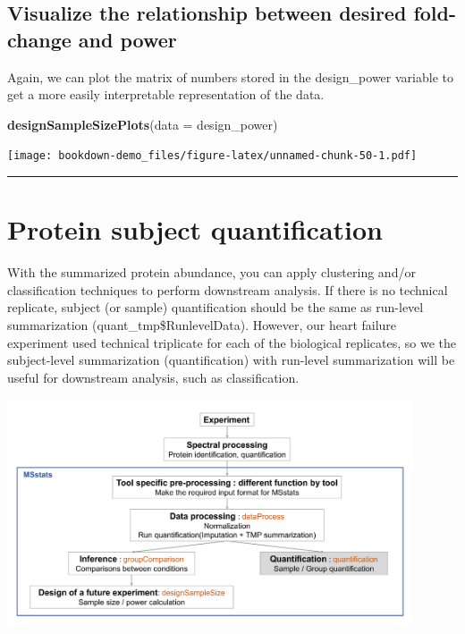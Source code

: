 \documentclass[]{book}
\newenvironment{Shaded}{\begin{snugshade}}{\end{snugshade}}
\newcommand{\DataTypeTok}[1]{\textcolor[rgb]{0.13,0.29,0.53}{#1}}
\newcommand{\KeywordTok}[1]{\textcolor[rgb]{0.13,0.29,0.53}{\textbf{#1}}}
\newcommand{\NormalTok}[1]{#1}
\begin{document}
\hypertarget{visualize-the-relationship-between-desired-fold-change-and-power}{%
\subsection{Visualize the relationship between desired fold-change and power}\label{visualize-the-relationship-between-desired-fold-change-and-power}}

Again, we can plot the matrix of numbers stored in the design\_power variable to get a more easily interpretable representation of the data.

\begin{Shaded}
\begin{Highlighting}[]
\KeywordTok{designSampleSizePlots}\NormalTok{(}\DataTypeTok{data =}\NormalTok{ design_power)}
\end{Highlighting}
\end{Shaded}

\texttt{[image: bookdown-demo\_files/figure-latex/unnamed-chunk-50-1.pdf]}

\begin{center}\rule{0.5\linewidth}{\linethickness}\end{center}

\hypertarget{protein-subject-quantification}{%
\section{Protein subject quantification}\label{protein-subject-quantification}}

With the summarized protein abundance, you can apply clustering and/or classification techniques to perform downstream analysis. If there is no technical replicate, subject (or sample) quantification should be the same as run-level summarization (quant\_tmp\$RunlevelData). However, our heart failure experiment used technical triplicate for each of the biological replicates, so we the subject-level summarization (quantification) with run-level summarization will be useful for downstream analysis, such as classification.

\includegraphics[width=0.9\textwidth,height=\textheight]{img/MSstats_workflow_quantification.png}
\end{document}
